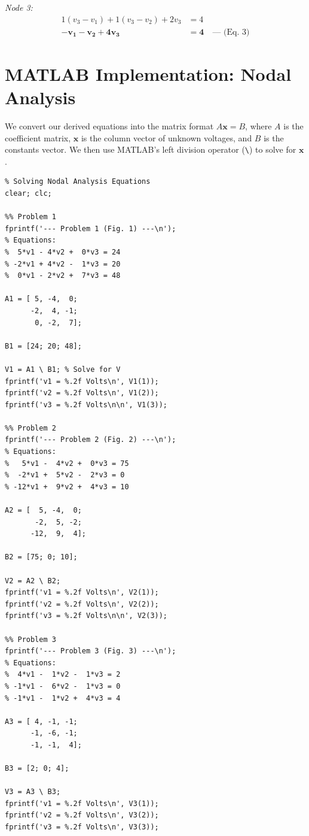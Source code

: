 \documentclass[11pt]{article}
\begin{document}
\textit{Node 3:}
\begin{align*}
  1(v_3 - v_1) + 1(v_3 - v_2) + 2v_3 &= 4 \\
  \mathbf{-v_1 - v_2 + 4v_3} &\mathbf{= 4} \quad \text{--- (Eq. 3)}
\end{align*}

\section*{MATLAB Implementation: Nodal Analysis}
We convert our derived equations into the matrix format $A \mathbf{x} = B$, where $A$ is the coefficient matrix, $\mathbf{x}$ is the column vector of unknown voltages, and $B$ is the constants vector. We then use MATLAB's left division operator (\texttt{\textbackslash}) to solve for $\mathbf{x}$.

\begin{lstlisting}[caption=MATLAB Script for Lab 3 Nodal Analysis (Problems 1-3)]
% ENGR 212 - Laboratory Experiment 3
% Solving Nodal Analysis Equations
clear; clc;

%% Problem 1
fprintf('--- Problem 1 (Fig. 1) ---\n');
% Equations:
%  5*v1 - 4*v2 +  0*v3 = 24
% -2*v1 + 4*v2 -  1*v3 = 20
%  0*v1 - 2*v2 +  7*v3 = 48

A1 = [ 5, -4,  0;
      -2,  4, -1;
       0, -2,  7];

B1 = [24; 20; 48];

V1 = A1 \ B1; % Solve for V
fprintf('v1 = %.2f Volts\n', V1(1));
fprintf('v2 = %.2f Volts\n', V1(2));
fprintf('v3 = %.2f Volts\n\n', V1(3));

%% Problem 2
fprintf('--- Problem 2 (Fig. 2) ---\n');
% Equations:
%   5*v1 -  4*v2 +  0*v3 = 75
%  -2*v1 +  5*v2 -  2*v3 = 0
% -12*v1 +  9*v2 +  4*v3 = 10

A2 = [  5, -4,  0;
       -2,  5, -2;
      -12,  9,  4];

B2 = [75; 0; 10];

V2 = A2 \ B2;
fprintf('v1 = %.2f Volts\n', V2(1));
fprintf('v2 = %.2f Volts\n', V2(2));
fprintf('v3 = %.2f Volts\n\n', V2(3));

%% Problem 3
fprintf('--- Problem 3 (Fig. 3) ---\n');
% Equations:
%  4*v1 -  1*v2 -  1*v3 = 2
% -1*v1 -  6*v2 -  1*v3 = 0
% -1*v1 -  1*v2 +  4*v3 = 4

A3 = [ 4, -1, -1;
      -1, -6, -1;
      -1, -1,  4];

B3 = [2; 0; 4];

V3 = A3 \ B3;
fprintf('v1 = %.2f Volts\n', V3(1));
fprintf('v2 = %.2f Volts\n', V3(2));
fprintf('v3 = %.2f Volts\n', V3(3));
\end{lstlisting}
\end{document}
